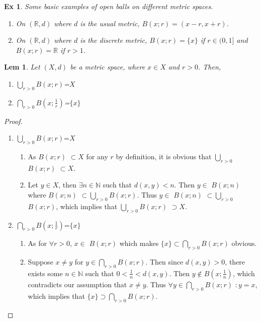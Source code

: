 \documentclass[paper=a4, fontsize=11pt]{scrartcl}
\newcommand{\ball}[2]{$B({#1};{#2})$}
\newtheorem{example}{Ex}
\newtheorem{lemma}{Lem}
\begin{document}
\begin{example}
	Some basic examples of open balls on different metric spaces.
	\begin{enumerate}[label=\arabic*)]
		\item On $(\mathbb{R},d)$ where $d$ is the usual metric, \ball{x}{r}$=(x-r,x+r)$.
		\item On $(\mathbb{R},d)$ where $d$ is the discrete metric, \ball{x}{r}$=\{x\}$  if $r\in(0,1]$ and  \ball{x}{r}$=\mathbb{R}$  if $r>1$.\\
	\end{enumerate}
\end{example}

\begin{lemma}
	Let $(X,d)$ be a metric space, where $x\in X$ and $r>0$. Then,
	\begin{enumerate}
		\item $\bigcup\limits_{r>0}$\ball{x}{r}=$X$
		\item $\bigcap\limits_{r>0}$\ball{x}{\frac{1}{r}}=$\{x\}$ \\
	\end{enumerate}
\end{lemma}

\begin{proof}
$ $\newline
\vspace{-0.15in}
	\begin{enumerate}
 		\item $\bigcup\limits_{r>0}$\ball{x}{r}=$X$\\
		\begin{enumerate}[label=(\roman*)]
			\item As \ball{x}{r} $\subset X$ for any $r$ by definition, it is obvious that $\bigcup\limits_{r>0}$\ball{x}{r} $\subset X$.
			\item Let $y \in X$, then $\exists n \in \mathbb{N}$ such that $d(x,y) < n$. Then $y \in$ \ball{x}{n} where \ball{x}{n} $\subset \bigcup\limits_{r>0}$\ball{x}{r}. Thus $y \in$ \ball{x}{n} $\subset \bigcup\limits_{r>0}$\ball{x}{r}, which implies that $\bigcup\limits_{r>0}$\ball{x}{r} $\supset X$.\\
		\end{enumerate}
		\item $\bigcap\limits_{r>0}$\ball{x}{\frac{1}{r}}=$\{x\}$ \\
		\begin{enumerate}[label=(\roman*)]
			\item As for $\forall r > 0$, $x \in$ \ball{x}{r} which makes $\{x\} \subset \bigcap\limits_{r>0}$\ball{x}{r} obvious.
			\item Suppose $x \neq y$ for $y \in \bigcap\limits_{r>0}$\ball{x}{r}. Then since $d(x,y)>0$, there exists some $n\in \mathbb{N}$ such that $0<\frac{1}{n}<d(x,y)$. Then $y \notin$\ball{x}{\frac{1}{n}}, which contradicts our assumption that $x \neq y$. Thus $\forall y \in \bigcap\limits_{r>0}$\ball{x}{r} $:y=x$, which implies that $\{x\} \supset \bigcap\limits_{r>0}$\ball{x}{r}.
		\end{enumerate}
	\end{enumerate}
\end{proof}
\end{document}

